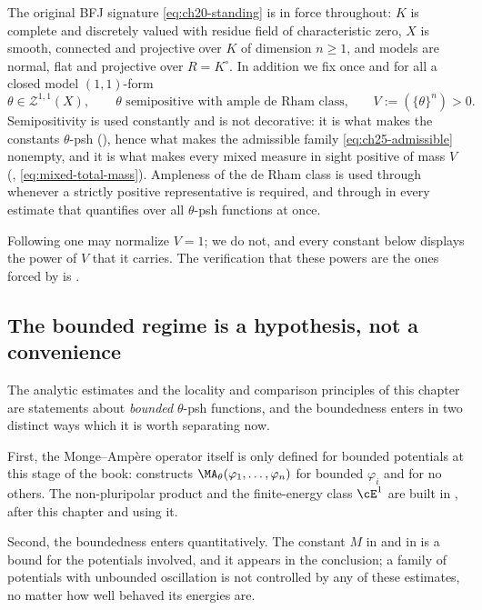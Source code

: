 The original BFJ signature \eqref{eq:ch20-standing} is in force throughout:
$K$ is complete and discretely valued with residue field of characteristic
zero, $X$ is smooth, connected and projective over $K$ of dimension
$n\geq1$, and models are normal, flat and projective over $R=K^\circ$.
In addition we fix once and for all a closed model $(1,1)$-form
\begin{equation}
\label{eq:ch25-reference-form}
 \theta\in\mathcal Z^{1,1}(X),
 \qquad\text{$\theta$ semipositive with ample de Rham class,}
 \qquad V:=(\{\theta\}^n)>0 .
\end{equation}
Semipositivity is used constantly and is not decorative: it is what makes the
constants $\theta$-psh (), hence what makes the
admissible family \eqref{eq:ch25-admissible} nonempty, and it is what makes
every mixed measure in sight positive of mass $V$
(, \eqref{eq:mixed-total-mass}).  Ampleness of the
de Rham class is used through
 whenever a strictly positive
representative is required, and through
 in every estimate that quantifies over
all $\theta$-psh functions at once.

Following \cite[\S\S4--5]{BFJ15} one may normalize $V=1$; we do not, and
every constant below displays the power of $V$ that it carries.  The
verification that these powers are the ones forced by
 is .

\subsection{The bounded regime is a hypothesis, not a convenience}
\label{sec:ch25-bounded-regime}

The analytic estimates and the locality and comparison principles of this
chapter are statements about \emph{bounded} $\theta$-psh functions, and the
boundedness enters in two distinct ways which it is worth separating now.

First, the Monge--Amp\`ere operator itself is only defined for bounded
potentials at this stage of the book: 
constructs $\MA_\theta(\varphi_1,\ldots,\varphi_n)$ for bounded
$\varphi_i$ and for no others.  The non-pluripolar product
 and the finite-energy class $\cE^1$ are built
in , after this chapter and using it.

Second, the boundedness enters quantitatively.  The constant
$M$ in  and in
 is a bound for the potentials
involved, and it appears in the conclusion; a family of potentials with
unbounded oscillation is not controlled by any of these estimates, no matter
how well behaved its energies are.

